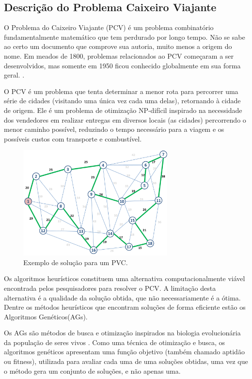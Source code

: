 \documentclass[
article,			%
11pt,				%
oneside,			%
a4paper,			%
english,			%
brazil,				%
sumario=tradicional
]{article}
\begin{document}
	\subsection{Descrição do Problema Caixeiro Viajante}

	O Problema do Caixeiro Viajante (PCV) é um problema combinatório fundamentalmente matemático que tem perdurado por longo tempo. Não se sabe ao certo um documento que comprove sua autoria, muito menos a origem do nome. Em meados de 1800, problemas relacionados ao PCV começaram a ser desenvolvidos, mas somente em 1950 ficou conhecido globalmente em sua forma geral. \cite{APPLEGATE}.

	O PCV é um problema que tenta determinar a menor rota para percorrer uma série de cidades (visitando uma única vez cada uma delas), retornando à cidade de origem. Ele é um problema de otimização NP-difícil inspirado na necessidade dos vendedores em realizar entregas em diversos locais (as cidades) percorrendo o menor caminho possível, reduzindo o tempo necessário para a viagem e os possíveis custos com transporte e combustível.

	\begin{figure}[H]
		\centering
		\includegraphics[width=0.7\textwidth]{Figuras/grafo-caixeiro-viajante.png}
		\caption{Exemplo de solução para um PVC.}
	\end{figure}

	Os algoritmos heurísticos constituem uma alternativa computacionalmente viável encontrada pelos pesquisadores para resolver o PCV. A limitação desta alternativa é a qualidade da solução obtida, que não necessariamente é a ótima. Dentre os métodos heurísticos que encontram soluções de forma eficiente estão os Algoritmos Genéticos(AGs).
	
	Os AGs são métodos de busca e otimização inspirados na biologia evolucionária da população de seres vivos \cite{DARWIN}\cite{HOLLAND} \cite{GOLDBERG}. Como uma técnica de otimização e busca, os algoritmos genéticos apresentam uma função objetivo (também chamado aptidão ou fitness), utilizada para avaliar cada uma de uma soluções obtidas, uma vez que o método gera um conjunto de soluções, e não apenas uma.
	
\end{document}
